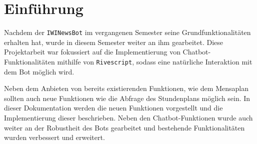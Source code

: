 \chapter{Einführung}

Nachdem der \texttt{IWINewsBot} im vergangenen Semester seine Grundfunktionalitäten erhalten hat, wurde in diesem Semester weiter an ihm gearbeitet. Diese Projektarbeit war fokussiert auf die Implementierung von Chatbot-Funktionalitäten mithilfe von \texttt{Rivescript}, sodass eine natürliche Interaktion mit dem Bot möglich wird. 

Neben dem Anbieten von bereits existierenden Funktionen, wie dem Mensaplan sollten auch neue Funktionen wie die Abfrage des Stundenplans möglich sein.
In dieser Dokumentation werden die neuen Funktionen vorgestellt und die Implementierung dieser beschrieben. Neben den Chatbot-Funktionen wurde auch weiter an der Robustheit des Bots gearbeitet und bestehende Funktionalitäten wurden verbessert und erweitert.